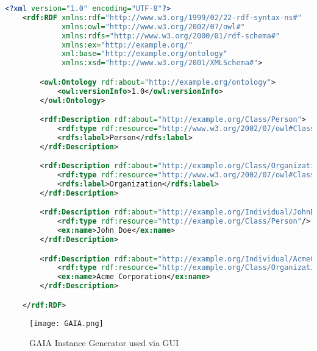 \begin{lstlisting}[language=XML, caption={Example of RDF/XML Data}, basicstyle=\ttfamily\footnotesize, frame=single]
    <?xml version="1.0" encoding="UTF-8"?>
    <rdf:RDF xmlns:rdf="http://www.w3.org/1999/02/22-rdf-syntax-ns#"
             xmlns:owl="http://www.w3.org/2002/07/owl#"
             xmlns:rdfs="http://www.w3.org/2000/01/rdf-schema#"
             xmlns:ex="http://example.org/"
             xml:base="http://example.org/ontology"
             xmlns:xsd="http://www.w3.org/2001/XMLSchema#">

        <owl:Ontology rdf:about="http://example.org/ontology">
            <owl:versionInfo>1.0</owl:versionInfo>
        </owl:Ontology>

        <rdf:Description rdf:about="http://example.org/Class/Person">
            <rdf:type rdf:resource="http://www.w3.org/2002/07/owl#Class"/>
            <rdfs:label>Person</rdfs:label>
        </rdf:Description>

        <rdf:Description rdf:about="http://example.org/Class/Organization">
            <rdf:type rdf:resource="http://www.w3.org/2002/07/owl#Class"/>
            <rdfs:label>Organization</rdfs:label>
        </rdf:Description>

        <rdf:Description rdf:about="http://example.org/Individual/JohnDoe">
            <rdf:type rdf:resource="http://example.org/Class/Person"/>
            <ex:name>John Doe</ex:name>
        </rdf:Description>

        <rdf:Description rdf:about="http://example.org/Individual/AcmeCorp">
            <rdf:type rdf:resource="http://example.org/Class/Organization"/>
            <ex:name>Acme Corporation</ex:name>
        </rdf:Description>

    </rdf:RDF>
\end{lstlisting}

\begin{figure}[H]
    \centering
    \texttt{[image: GAIA.png]}\\
    \caption{GAIA Instance Generator used via GUI}\label{fig:gaia}
  \end{figure}


